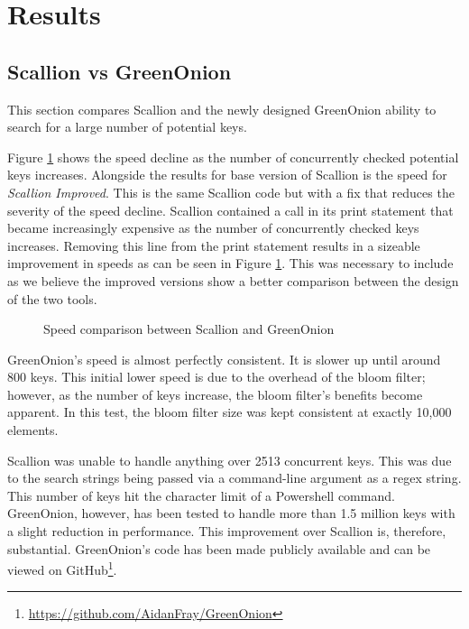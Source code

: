 \section{Results}


\subsection{Scallion vs GreenOnion}
\label{sec:SvG}

This section compares Scallion and the newly designed GreenOnion ability to search for a large number of potential keys.

Figure \ref{tab:scallion_speed} shows the speed decline as the number of concurrently checked potential keys increases. Alongside the results for base version of Scallion is the speed for \textit{Scallion Improved}. This is the same Scallion code but with a fix that reduces the severity of the speed decline. Scallion contained a call in its print statement that became increasingly expensive as the number of concurrently checked keys increases. Removing this line from the print statement results in a sizeable improvement in speeds as can be seen in Figure \ref{tab:scallion_speed}. This was necessary to include as we believe the improved versions show a better comparison between the design of the two tools. 

\begin{figure}[h!]
    \centering
    
    \label{tab:scallion_speed}
    \caption{Speed comparison between Scallion and GreenOnion}
\end{figure}

GreenOnion's speed is almost perfectly consistent. It is slower up until  around 800 keys. This initial lower speed is due to the overhead of the bloom filter; however, as the number of keys increase, the bloom filter's benefits become apparent. In this test, the bloom filter size was kept consistent at exactly 10,000 elements. 

Scallion was unable to handle anything over 2513 concurrent keys. This was due to the search strings being passed via a command-line argument as a regex string. This number of keys hit the character limit of a Powershell command. GreenOnion, however, has been tested to handle more than 1.5 million keys with a slight reduction in performance. This improvement over Scallion is, therefore, substantial. GreenOnion's code has been made publicly available and can be viewed on GitHub\footnote{\url{https://github.com/AidanFray/GreenOnion}}.

